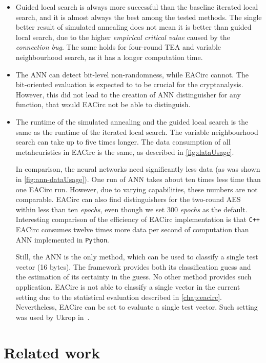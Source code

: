 \documentclass[
  print, %
  Table,   %
  nolof,     %
  nolot,     %
  11pt, %
  oneside  %
]{fithesis3}
\begin{document}
\begin{itemize}
    \item Guided local search is always more successful than the baseline iterated local search, and it is almost always the best among the tested methods. The single better result of simulated annealing does not mean it is better than guided local search, due to the higher \textit{empirical critical value} caused by the \textit{connection bug}. The same holds for four-round TEA and variable neighbourhood search, as it has a longer computation time.
    \item The ANN can detect bit-level non-randomness, while EACirc cannot. The bit-oriented evaluation is expected to to be crucial for the cryptanalysis. However, this did not lead to the creation of ANN distinguisher for any function, that would EACirc not be able to distinguish.
    \item The runtime of the simulated annealing and the guided local search is the same as the runtime of the iterated local search. The variable neighbourhood search can take up to five times longer. The data consumption of all metaheuristics in EACirc is the same, as described in \cref{fig:dataUsage}.
    
    In comparison, the neural networks need significantly less data (as was shown in \cref{fig:ann-dataUsage}). One run of ANN takes about ten times less time than one EACirc run. However, due to varying capabilities, these numbers are not comparable. EACirc can also find distinguishers for the two-round AES within less than ten \textit{epochs}, even though we set 300 \textit{epochs} as the default. Interesting comparison of the efficiency of EACirc implementation is that \texttt{C++} EACirc consumes twelve times more data per second of computation than ANN implemented in \texttt{Python}.
    
    Still, the ANN is the only method, which can be used to classify a single test vector (16 bytes). The framework provides both its classification guess and the estimation of its certainty in the guess. No other method provides such application. EACirc is not able to classify a single vector in the current setting due to the statistical evaluation described in \cref{chap:eacirc}. Nevertheless, EACirc can be set to evaluate a single test vector. Such setting was used by Ukrop in~\cite{ukropBcThesis}.
\end{itemize}

\chapter{Related work}
\label{chap:relatwork}
\end{document}
